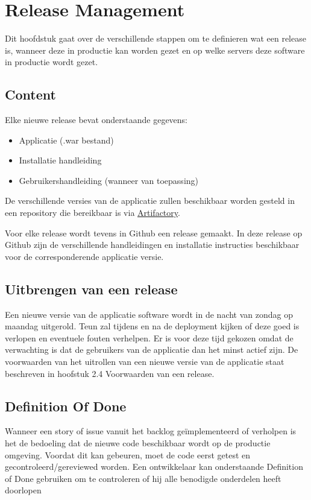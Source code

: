 \chapter{Release Management}
Dit hoofdstuk gaat over de verschillende stappen om te definieren wat een release is, wanneer deze in productie kan worden gezet en op welke servers deze software in productie wordt gezet.

\section{Content}
Elke nieuwe release bevat onderstaande gegevens:

\begin{itemize}
	\item Applicatie (.war bestand)
	\item Installatie handleiding
	\item Gebruikershandleiding (wanneer van toepassing)	
\end{itemize}

De verschillende versies van de applicatie zullen beschikbaar worden gesteld in een repository die bereikbaar is via \href{85.144.215.28:8082}{Artifactory}.

Voor elke release wordt tevens in Github een release gemaakt. In deze release op Github zijn de verschillende handleidingen en installatie instructies beschikbaar voor de corresponderende applicatie versie.

\section{Uitbrengen van een release}
Een nieuwe versie van de applicatie software wordt in de nacht van zondag op maandag uitgerold. 
Teun zal tijdens en na de deployment kijken of deze goed is verlopen en eventuele fouten verhelpen.
Er is voor deze tijd gekozen omdat de verwachting is dat de gebruikers van de applicatie dan het minst actief zijn. De voorwaarden van het uitrollen van een nieuwe versie van de applicatie staat beschreven in hoofstuk 2.4 Voorwaarden van een release.

\section{Definition Of Done}
\label{sec:dod}
Wanneer een story of issue vanuit het backlog geïmplementeerd of verholpen is het de bedoeling dat de nieuwe code beschikbaar wordt op de productie omgeving. Voordat dit kan gebeuren, moet de code eerst getest en gecontroleerd/gereviewed worden. Een ontwikkelaar kan onderstaande Definition of Done gebruiken om te controleren of hij alle benodigde onderdelen heeft doorlopen
	
